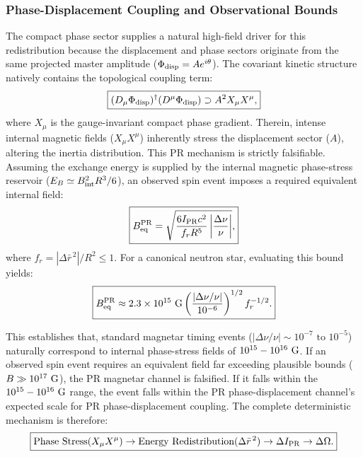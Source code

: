 \documentclass[11pt]{article}
\begin{document}
\subsubsection{Phase-Displacement Coupling and Observational Bounds}
The compact phase sector supplies a natural high-field driver for this redistribution because the displacement and phase sectors originate from the same projected master amplitude ($\Phi_{\rm disp} = A e^{i\theta}$). The covariant kinetic structure natively contains the topological coupling term:
\begin{equation}
\boxed{
(D_\mu\Phi_{\rm disp})^\dagger
(D^\mu\Phi_{\rm disp})
\supset
A^2X_\mu X^\mu,
}
\end{equation}
where $X_\mu$ is the gauge-invariant compact phase gradient. Therein, intense internal magnetic fields ($X_\mu X^\mu$) inherently stress the displacement sector ($A$), altering the inertia distribution. This PR mechanism is strictly falsifiable. Assuming the exchange energy is supplied by the internal magnetic phase-stress reservoir ($E_B \simeq B_{\rm int}^2R^3/6$), an observed spin event imposes a required equivalent internal field:
\begin{equation}
\boxed{
B_{\rm eq}^{\rm PR}
=
\sqrt{
\frac{
6I_{\rm PR}c^2
}{
f_rR^5
}
\left|
\frac{\Delta\nu}{\nu}
\right|
},
}
\end{equation}
where $f_r = |\Delta\bar r^{\,2}|/R^2 \le 1$. For a canonical neutron star, evaluating this bound yields:
\begin{equation}
\boxed{
B_{\rm eq}^{\rm PR}
\approx
2.3\times10^{15}\ {\rm G}
\left(
\frac{|\Delta\nu/\nu|}{10^{-6}}
\right)^{1/2}
f_r^{-1/2}.
}
\end{equation}

This establishes that, standard magnetar timing events ($|\Delta\nu/\nu| \sim 10^{-7} \text{ to } 10^{-5}$) naturally correspond to internal phase-stress fields of $10^{15} - 10^{16}\ {\rm G}$. If an observed spin event requires an equivalent field far exceeding plausible bounds ($B \gg 10^{17}\ {\rm G}$), the PR magnetar channel is falsified. If it falls within the $10^{15} - 10^{16}\ {\rm G}$ range, the event falls within the PR phase-displacement channel's expected scale for PR phase-displacement coupling. The complete deterministic mechanism is therefore:
\begin{equation}
\boxed{
\text{Phase Stress} (X_\mu X^\mu) \rightarrow \text{Energy Redistribution} (\Delta\bar r^{\,2}) \rightarrow \Delta I_{\rm PR} \rightarrow \Delta\Omega.
}
\end{equation}
\end{document}
